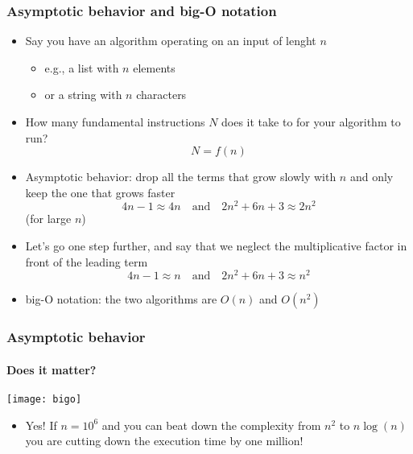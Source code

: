\documentclass[9pt]{beamer}
\begin{document}
\begin{frame}
  \frametitle{Asymptotic behavior and big-O notation}
  \begin{itemize}
  \item Say you have an algorithm operating on an input of lenght $n$
    \begin{itemize}
    \item e.g., a list with $n$ elements
    \item or a string with $n$ characters 
    \end{itemize}
  \item How many fundamental instructions $N$ does it take to for your algorithm
    to run?
    $$
    N = f(n)
    $$
  \item \alert{Asymptotic behavior}: drop all the terms that grow slowly with
    $n$ and only keep the one that grows faster
    $$
    4n - 1 \approx 4n \quad\text{and}\quad 2n^2 + 6n + 3 \approx 2n^2
    $$
    (for large $n$)
  \item Let's go one step further, and say that we neglect the multiplicative
    factor in front of the leading term
    $$
    4n - 1 \approx n \quad\text{and}\quad 2n^2 + 6n + 3 \approx n^2
    $$
  \item \alert{big-O notation}: the two algorithms are $O(n)$ and $O(n^2)$
  \end{itemize}
\end{frame}


\begin{frame}
  \frametitle{Asymptotic behavior}
  \framesubtitle{Does it matter?}
  \centering\texttt{[image: bigo]}

  \begin{itemize}
  \item Yes! If $n = 10^6$ and you can beat down the complexity from $n^2$ to
    $n\log(n)$ you are cutting down the execution time by one million!
  \end{itemize}
\end{frame}
\end{document}
